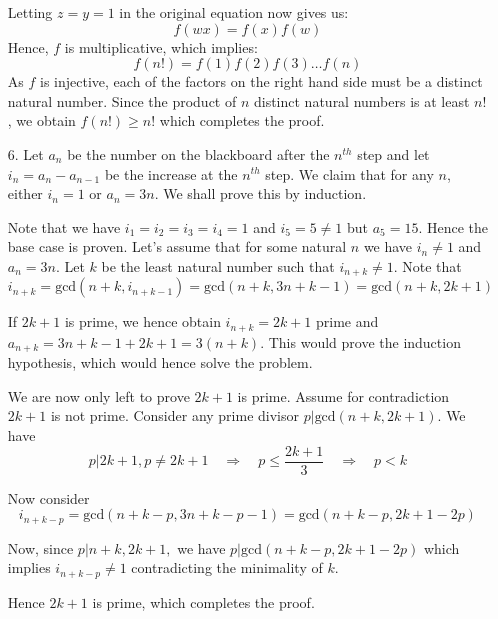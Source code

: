 \documentclass[a4paper, 12pt]{article}
\begin{document}
\begin{enumerate}
    Letting $z = y = 1$ in the original equation now gives us:
    $$ f(wx) = f(x) f(w) $$
    Hence, $f$ is multiplicative, which implies:
    $$ f(n!) = f(1) f(2) f(3) \dots f(n) $$
    As $f$ is injective, each of the factors on the right hand side must be a distinct natural number. Since the product of $n$ distinct natural numbers is at least $n!$, we obtain $f(n!) \geq n!$ which completes the proof.
    
    
    
    \item[6.] Let $a_n$ be the number on the blackboard after the $n^{th}$ step and let $i_n = a_n - a_{n-1}$ be the increase at the $n^{th}$ step. We claim that for any $n$, either $i_n = 1$ or $a_n = 3n$. We shall prove this by induction.
    
    Note that we have $i_1=i_2=i_3=i_4=1$ and $i_5=5\neq 1$ but $a_5=15$. Hence the base case is proven. Let's assume that for some natural $n$ we have $i_n\neq 1$ and $a_n=3n$. Let $k$ be the least natural number such that $i_{n+k}\neq 1$. Note that
    $$ i_{n+k}=\textrm{gcd}(n+k, i_{n+k-1})=\textrm{gcd}(n+k, 3n+k-1)=\textrm{gcd}(n+k, 2k+1) $$
    
    If $2k+1$ is prime, we hence obtain $i_{n+k}=2k+1$ prime and $a_{n+k}=3n+k-1+2k+1=3(n+k)$. This would prove the induction hypothesis, which would hence solve the problem.
    
    We are now only left to prove $2k+1$ is prime. Assume for contradiction $2k+1$ is not prime. Consider any prime divisor $p|\textrm{gcd}(n+k, 2k+1)$. We have
     $$ p|2k+1, p\neq 2k+1 \quad \Longrightarrow \quad p \leq \frac{2k+1}{3} \quad \Longrightarrow \quad p<k $$
     
     Now consider
     $$ i_{n+k-p}=\textrm{gcd}(n+k-p, 3n+k-p-1)=\textrm{gcd}(n+k-p, 2k+1-2p) $$
     
     Now, since $p|n+k, 2k+1,$ we have $p|\textrm{gcd}(n+k-p, 2k+1-2p)$ which implies $ i_{n+k-p} \neq 1$ contradicting the minimality of $k$.
     
     Hence $2k+1$ is prime, which completes the proof.
    
    
\end{enumerate}


\centering
\begin{BVerbatim}
\end{BVerbatim}
\end{document}
